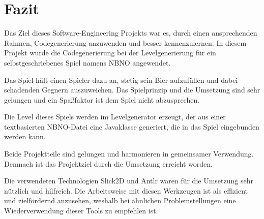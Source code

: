 \section{Fazit}

Das Ziel dieses Software-Engineering Projekts war es, durch einen ansprechenden Rahmen, Codegenerierung anzuwenden und besser kennenzulernen.
In diesem Projekt wurde die Codegenerierung bei der Levelgenerierung für ein selbstgeschriebenes Spiel namens NBNO angewendet.

Das Spiel hält einen Spieler dazu an, stetig sein Bier aufzufüllen und dabei schadenden Gegnern auszuweichen.
Das Spielprinzip und die Umsetzung sind sehr gelungen und ein Spaßfaktor ist dem Spiel nicht abzusprechen.

Die Level dieses Spiels werden im Levelgenerator erzeugt, der aus einer textbasierten NBNO-Datei eine Javaklasse generiert, die in das Spiel eingebunden werden kann.

Beide Projektteile sind gelungen und harmonieren in gemeinsamer Verwendung. Demnach ist das Projektziel durch die Umsetzung erreicht worden.

Die verwendeten Technologien Slick2D und Antlr waren für die Umsetzung sehr nützlich und hilfreich.
Die Arbeitsweise mit diesen Werkzeugen ist als effizient und zielfördernd anzusehen, weshalb bei ähnlichen Problemstellungen eine Wiederverwendung dieser Tools zu empfehlen ist.